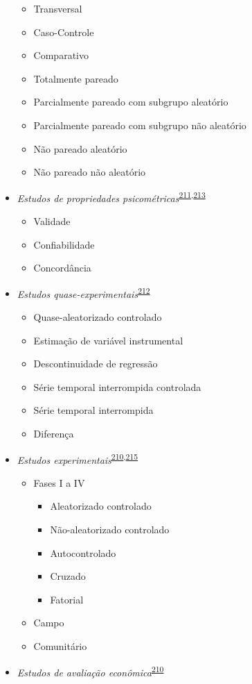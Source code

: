 \documentclass[
  a4paper,
]{book}
\begin{document}
\begin{itemize}
  \begin{itemize}
  \item
    Transversal
  \item
    Caso-Controle
  \item
    Comparativo
  \item
    Totalmente pareado
  \item
    Parcialmente pareado com subgrupo aleatório
  \item
    Parcialmente pareado com subgrupo não aleatório
  \item
    Não pareado aleatório
  \item
    Não pareado não aleatório
  \end{itemize}
\item
  \emph{Estudos de propriedades psicométricas}\textsuperscript{\protect\hyperlink{ref-Souza2017}{211},\protect\hyperlink{ref-echevarruxeda-guanilo2019}{213}}

  \begin{itemize}
  \item
    Validade
  \item
    Confiabilidade
  \item
    Concordância
  \end{itemize}
\item
  \emph{Estudos quase-experimentais}\textsuperscript{\protect\hyperlink{ref-reeves2017}{212}}

  \begin{itemize}
  \item
    Quase-aleatorizado controlado
  \item
    Estimação de variável instrumental
  \item
    Descontinuidade de regressão
  \item
    Série temporal interrompida controlada
  \item
    Série temporal interrompida
  \item
    Diferença
  \end{itemize}
\item
  \emph{Estudos experimentais}\textsuperscript{\protect\hyperlink{ref-Suxfct2014}{210},\protect\hyperlink{ref-Chidambaram2019}{215}}

  \begin{itemize}
  \item
    Fases I a IV

    \begin{itemize}
    \item
      Aleatorizado controlado
    \item
      Não-aleatorizado controlado
    \item
      Autocontrolado
    \item
      Cruzado
    \item
      Fatorial
    \end{itemize}
  \item
    Campo
  \item
    Comunitário
  \end{itemize}
\item
  \emph{Estudos de avaliação econômica}\textsuperscript{\protect\hyperlink{ref-Suxfct2014}{210}}


\end{itemize}
\end{document}
